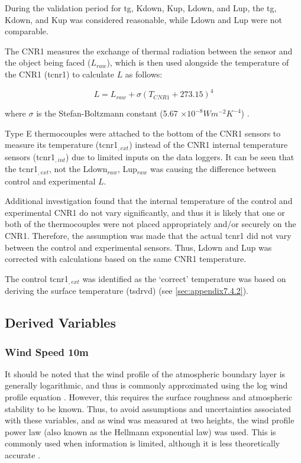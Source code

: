\documentclass[final,3p,times,authoryear]{elsarticle}
\begin{document}
During the validation period for \gls{tg}, \gls{Kdown}, \gls{Kup}, \gls{Ldown}, and \gls{Lup}, the \gls{tg}, \gls{Kdown}, and \gls{Kup} was considered reasonable, while \gls{Ldown} and \gls{Lup} were not comparable.

The CNR1 measures the exchange of thermal radiation between the sensor and the object being faced ($L_{raw}$), which is then used alongside the temperature of the CNR1 (\gls{tcnr1}) to calculate $L$ as follows:

\begin{equation}
L = L_{raw} + \sigma (T_{CNR1} + 273.15)^{4}
\label{eq:7.3} 
\end{equation}

where $\sigma$ is the Stefan-Boltzmann constant (5.67 $\times 10^{-8} Wm^{-2}K^{-4}$) \citep{CampbellScientific2011}.

Type E thermocouples were attached to the bottom of the CNR1 sensors to measure its temperature (\gls{tcnr1}$_{,ext}$) instead of the CNR1 internal temperature sensors (\gls{tcnr1}$_{,int}$) due to limited inputs on the data loggers. It can be seen that the \gls{tcnr1}$_{,ext}$, not the \gls{Ldown}$_{raw}$, \gls{Lup}$_{raw}$ was causing the difference between control and experimental $L$. 

Additional investigation found that the internal temperature of the control and experimental CNR1 do not vary significantly, and thus it is likely that one or both of the thermocouples were not placed appropriately and/or securely on the CNR1. Therefore, the assumption was made that the actual \gls{tcnr1} did not vary between the control and experimental sensors. Thus, \gls{Ldown} and \gls{Lup} was corrected with calculations based on the same CNR1 temperature.

The control \gls{tcnr1}$_{,ext}$ was identified as the `correct' temperature was based on deriving the surface temperature (\gls{tsdrvd}) (see \ref{sec:appendix7.4.2}).



\subsection{Derived Variables}\label{sec:appendix7.4}
\subsubsection{Wind Speed 10m}\label{sec:appendix7.4.1}

It should be noted that the wind profile of the atmospheric boundary layer is generally logarithmic, and thus is commonly approximated using the log wind profile equation \citep{Banuelos-Ruedas2010}. However, this requires the surface roughness and atmospheric stability to be known. Thus, to avoid assumptions and uncertainties associated with these variables, and as wind was measured at two heights, the wind profile power law (also known as the Hellmann exponential law) was used. This is commonly used when information is limited, although it is less theoretically accurate \citep{Banuelos-Ruedas2010}.
\end{document}

